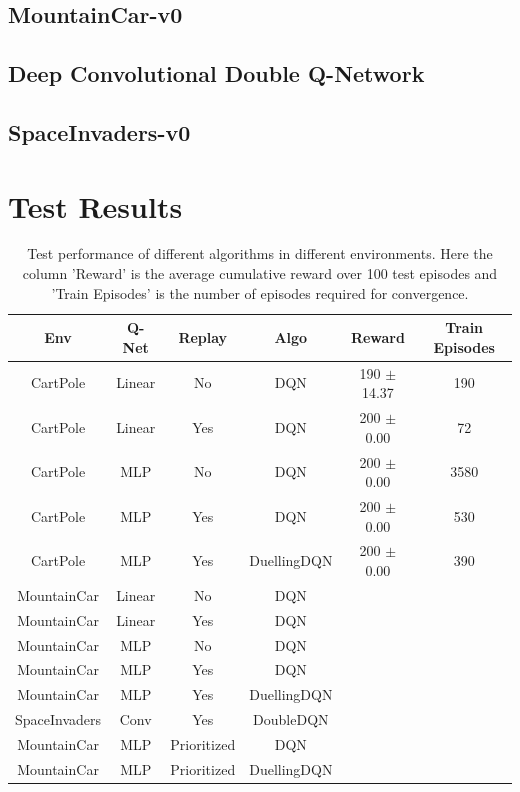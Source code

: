 \documentclass[12pt]{article}
\begin{document}
\pagebreak[4]
\subsection*{MountainCar-v0}

\pagebreak[4]
\subsection{Deep Convolutional Double Q-Network}
\subsection*{SpaceInvaders-v0}

\pagebreak[4]
\section{Test Results}

\begin{table}[h]
\centering
\label{resulttable}
\begin{tabular}{cccccc}
\hline
Env           & Q-Net  & Replay      & Algo        & Reward    & Train Episodes \\ \hline
CartPole      & Linear & No          & DQN         & 190 $\pm$ 14.37 & 190      \\
CartPole      & Linear & Yes         & DQN         & 200 $\pm$ 0.00  & 72       \\
CartPole      & MLP    & No          & DQN         & 200 $\pm$ 0.00  & 3580     \\
CartPole      & MLP    & Yes         & DQN         & 200 $\pm$ 0.00  & 530      \\
CartPole      & MLP    & Yes         & DuellingDQN & 200 $\pm$ 0.00  & 390      \\
MountainCar   & Linear & No          & DQN         &           &          \\
MountainCar   & Linear & Yes         & DQN         &           &          \\
MountainCar   & MLP    & No          & DQN         &           &          \\
MountainCar   & MLP    & Yes         & DQN         &           &          \\
MountainCar   & MLP    & Yes         & DuellingDQN &           &          \\
SpaceInvaders & Conv   & Yes         & DoubleDQN   &           &          \\ \hline
MountainCar   & MLP    & Prioritized & DQN         &           &          \\
MountainCar   & MLP    & Prioritized & DuellingDQN &           &          \\ \hline
\end{tabular}
\caption{Test performance of different algorithms in different environments. Here the column 'Reward' is the average cumulative reward over 100 test episodes and 'Train Episodes' is the number of episodes required for convergence.}
\end{table}

\pagebreak[4]

\nocite{*}


\end{document}
